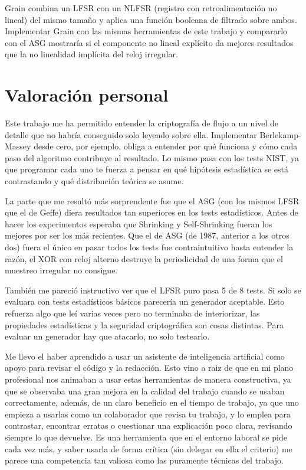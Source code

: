 Grain combina un LFSR con un NLFSR (registro con retroalimentación no lineal) del mismo tamaño y aplica una función booleana de filtrado sobre ambos.
Implementar Grain con las mismas herramientas de este trabajo y compararlo con el ASG mostraría si el componente no lineal explícito da mejores resultados
que la no linealidad implícita del reloj irregular.

\section{Valoración personal}

Este trabajo me ha permitido entender la criptografía de flujo a un nivel de detalle que no habría conseguido solo leyendo sobre ella.
Implementar Berlekamp-Massey desde cero, por ejemplo, obliga a entender por qué funciona y cómo cada paso del algoritmo contribuye al resultado.
Lo mismo pasa con los tests NIST, ya que programar cada uno te fuerza a pensar en qué hipótesis estadística se está contrastando
y qué distribución teórica se asume.

La parte que me resultó más sorprendente fue que el ASG (con los mismos LFSR que el de Geffe) diera resultados tan superiores en los tests estadísticos.
Antes de hacer los experimentos esperaba que Shrinking y Self-Shrinking fueran los mejores por ser los más recientes.
Que el de ASG (de 1987, anterior a los otros dos) fuera el único en pasar todos los tests fue contraintuitivo hasta entender la razón,
el XOR con reloj alterno destruye la periodicidad de una forma que el muestreo irregular no consigue.

También me pareció instructivo ver que el LFSR puro pasa 5 de 8 tests. Si solo se evaluara con tests estadísticos básicos parecería un generador aceptable.
Esto refuerza algo que leí varias veces pero no terminaba de interiorizar, las propiedades estadísticas y la seguridad criptográfica son cosas distintas.
Para evaluar un generador hay que atacarlo, no solo testearlo.

Me llevo el haber aprendido a usar un asistente de inteligencia artificial como apoyo para revisar el código y la redacción.
Esto vino a raiz de que en mi plano profesional nos animaban a usar estas herramientas de manera constructiva, ya que se observaba una gran mejora en la calidad del trabajo cuando se usaban correctamente,
además, de un claro beneficio en el tiempo de trabajo, ya que uno empieza a usarlas como un colaborador que revisa tu trabajo, y lo emplea para contrastar, encontrar erratas o cuestionar una explicación poco clara, revisando siempre lo que devuelve.
Es una herramienta que en el entorno laboral se pide cada vez más, y saber usarla de forma crítica (sin delegar en ella el criterio) me parece una competencia tan valiosa como las
puramente técnicas del trabajo.

